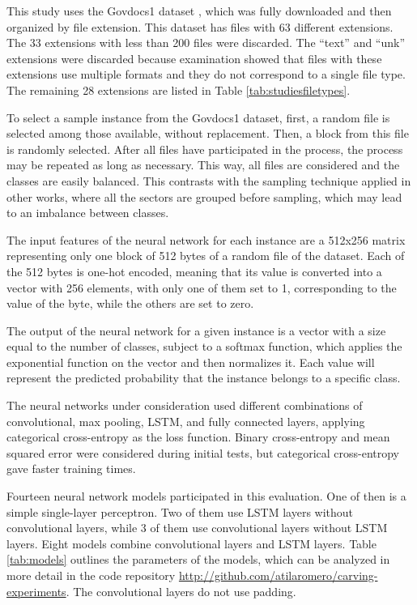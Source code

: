 
This study uses the Govdocs1 dataset \cite{garfinkel_bringing_2009}, which was fully downloaded and then organized by file extension.
This dataset has files with 63 different extensions. The 33 extensions with less than 200 files were discarded. The  ``text'' and ``unk'' extensions were discarded because examination showed that files with these extensions use multiple formats and they do not correspond to a single file type.
The remaining 28 extensions are listed in Table \ref{tab:studiesfiletypes}.

To select a sample instance from the Govdocs1 dataset, first, a random file is selected among those available, without replacement. Then, a block from this file is randomly selected. After all files have participated in the process, the process may be repeated as long as necessary. This way, all files are considered and the classes are easily balanced.
This contrasts with the sampling technique applied in other works, where all the sectors are grouped before sampling, which may lead to an imbalance between classes.

The input features of the neural network for each instance are a 512x256 matrix representing only one block of 512 bytes of a random file of the dataset. Each of the 512 bytes is one-hot encoded, meaning that its value is converted into a vector with 256 elements, with only one of them set to 1, corresponding to the value of the byte, while the others are set to zero.


The output of the neural network for a given instance is a vector with a size equal to the number of classes, subject to a softmax function, which applies the exponential function on the vector and then normalizes it. Each value will represent the predicted probability that the instance belongs to a specific class.

The neural networks under consideration used different combinations of convolutional, max pooling, LSTM, and fully connected layers, applying categorical cross-entropy as the loss function. Binary cross-entropy  and mean squared error  were considered during initial tests, but categorical cross-entropy gave faster training times.

Fourteen neural network models participated in this evaluation. One of then is a simple single-layer perceptron. Two of them use LSTM layers without convolutional layers, while 3 of them use convolutional layers without LSTM layers. Eight models combine convolutional layers and LSTM layers. Table \ref{tab:models} outlines the parameters of the models, which can be analyzed in more detail in the code repository \sloppy\url{http://github.com/atilaromero/carving-experiments}. The convolutional layers do not use padding. 

